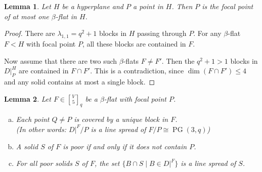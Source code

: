 \documentclass[a4paper,abstracton,12pt]{scrartcl}
\newcommand{\qbinom}[3]{\genfrac{[}{]}{0pt}{}{#1}{#2}_{#3}}
\DeclareMathOperator{\PG}{PG}
\newtheorem{lemma}{Lemma}[section]
\theoremstyle{definition}
\theoremstyle{remark}
\begin{document}
\begin{lemma}
	\label{lem:beta_flat_unique}
	Let $H$ be a hyperplane and $P$ a point in $H$.
	Then $P$ is the focal point of at most one $\beta$-flat in $H$.
\end{lemma}

\begin{proof}
	There are $\lambda_{1,1} = q^2 + 1$ blocks in $H$ passing through $P$.
	For any $\beta$-flat $F < H$ with focal point $P$, all these blocks are contained in $F$.

	Now assume that there are two such $\beta$-flats $F \neq F'$.
	Then the $q^2 + 1 > 1$ blocks in $D|_P^H$ are contained in $F \cap F'$.
	This is a contradiction, since $\dim(F \cap F') \leq 4$ and any solid contains at most a single block.
\end{proof}

\begin{lemma}
	\label{lem:beta_flat}
	Let $F\in\qbinom{V}{5}{q}$ be a $\beta$-flat with focal point $P$.
	\begin{enumerate}[(a)]
		\item\label{lem:beta_flat:modspread} Each point $Q \neq P$ is covered by a unique block in $F$. \\
		(In other words: $D|^F / P$ is a line spread of $F/P \cong \PG(3,q)$)
		\item\label{lem:beta_flat:poor} A solid $S$ of $F$ is poor if and only if it does not contain $P$.
		\item\label{lem:beta_flat:poorspread} For all poor solids $S$ of $F$, the set $\{B \cap S \mid B\in D|^F\}$ is a line spread of $S$.
	\end{enumerate}
\end{lemma}
\end{document}
